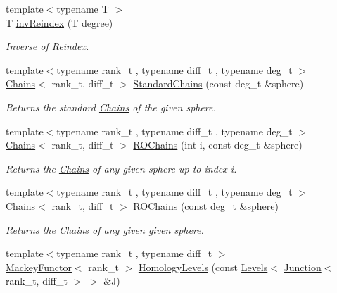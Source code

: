 \begin{DoxyCompactItemize}
{\footnotesize template$<$typename T $>$ }\\T \hyperlink{namespaceMackey_a5efb3695c450e4e590b86f20700f726b}{inv\+Reindex} (T degree)
\begin{DoxyCompactList}\small\item\em Inverse of \hyperlink{namespaceMackey_a7da73ade3ee83c4ffd614e79242d7c04}{Reindex}. \end{DoxyCompactList}\item 
{\footnotesize template$<$typename rank\+\_\+t , typename diff\+\_\+t , typename deg\+\_\+t $>$ }\\\hyperlink{classMackey_1_1Chains}{Chains}$<$ rank\+\_\+t, diff\+\_\+t $>$ \hyperlink{namespaceMackey_a425b988266cedec0299fb539d99179b1}{Standard\+Chains} (const deg\+\_\+t \&sphere)
\begin{DoxyCompactList}\small\item\em Returns the standard \hyperlink{classMackey_1_1Chains}{Chains} of the given sphere. \end{DoxyCompactList}\item 
{\footnotesize template$<$typename rank\+\_\+t , typename diff\+\_\+t , typename deg\+\_\+t $>$ }\\\hyperlink{classMackey_1_1Chains}{Chains}$<$ rank\+\_\+t, diff\+\_\+t $>$ \hyperlink{namespaceMackey_a08fd3743ffb625fceca454da757dfa5d}{R\+O\+Chains} (int i, const deg\+\_\+t \&sphere)
\begin{DoxyCompactList}\small\item\em Returns the \hyperlink{classMackey_1_1Chains}{Chains} of any given sphere up to index i. \end{DoxyCompactList}\item 
{\footnotesize template$<$typename rank\+\_\+t , typename diff\+\_\+t , typename deg\+\_\+t $>$ }\\\hyperlink{classMackey_1_1Chains}{Chains}$<$ rank\+\_\+t, diff\+\_\+t $>$ \hyperlink{namespaceMackey_abd3c2e12c91baa573c6dbaa37eeb0518}{R\+O\+Chains} (const deg\+\_\+t \&sphere)
\begin{DoxyCompactList}\small\item\em Returns the \hyperlink{classMackey_1_1Chains}{Chains} of any given given sphere. \end{DoxyCompactList}\item 
{\footnotesize template$<$typename rank\+\_\+t , typename diff\+\_\+t $>$ }\\\hyperlink{classMackey_1_1MackeyFunctor}{Mackey\+Functor}$<$ rank\+\_\+t $>$ \hyperlink{namespaceMackey_a1c195484cc947abef84c726b534af5a5}{Homology\+Levels} (const \hyperlink{classMackey_1_1Levels}{Levels}$<$ \hyperlink{classMackey_1_1Junction}{Junction}$<$ rank\+\_\+t, diff\+\_\+t $>$ $>$ \&J)

\end{DoxyCompactItemize}

